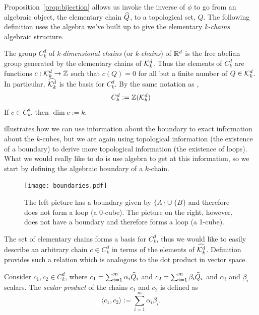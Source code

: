 Proposition~\ref{prop:bijection} allows us invoke the inverse of $\phi$ to go from an algebraic object, the elementary chain $\widehat{Q}$, to a topological set, $Q$. The following definition uses the algebra we've built up to give the elementary \textit{k-chains} algebraic structure.
%
\begin{defn}
	The group $C_k^d$ of \textit{k-dimensional chains} (or \textit{k-chains}) of $\mathbb{R}^d$ is the free abelian group generated by the elementary chains of $\mathcal{K}^{d}_k$. Thus the elements of $C_k^d$ are functions $c : \mathcal{K}^{d}_k \rightarrow \mathbb{Z}$ such that $c(Q) = 0$ for all but a finite number of $Q \in \mathcal{K}^{d}_k$. In particular, $\widehat{\mathcal{K}^{d}_k}$ is the basis for $C_k^d$. By the same notation as ,
	$$ C_k^d := \mathbb{Z}(\mathcal{K}^{d}_k) $$
	If $ c \in C_k^d$, then $\dim c := k$.
\end{defn}

 illustrates how we can use information about the boundary to exact information about the $k$-cubes, but we are again using topological information (the existence of a boundary) to derive more topological information (the existence of loops). What we would really like to do is use algebra to get at this information, so we start by defining the algebraic boundary of a $k$-chain.
%
\begin{figure}[h]
	\begin{center}
	\texttt{[image: boundaries.pdf]}
	\caption{\label{fig:boundaries} The left picture has a boundary given by $\{ A \} \cup \{ B \}$ and therefore does not form a loop (a 0-cube). The picture on the right, however, does not have a boundary and therefore forms a loop (a 1-cube).}
	\end{center}
\end{figure}

The set of elementary chains forms a basis for $C_k^d$, thus we would like to easily describe an arbitrary chain $c \in C_k^d$ in terms of the elements of $\widehat{\mathcal{K}^{d}_k}$. Definition  provides such a relation which is analogous to the dot product in vector space.

\begin{defn} \label{defn:chainprod}
	Consider $c_1, c_2 \in C_k^d$, where $c_1 = \sum_{i=1}^m \alpha_i \widehat{Q}_i $ and $ c_2 = \sum_{i=1}^m \beta_i \widehat{Q}_i $ and $\alpha_i$ and $\beta_i$ scalars. The \textit{scalar product} of the chains $c_1$ and $c_2$ is defined as
	$$ \langle c_1, c_2 \rangle := \sum_{i=1}^m \alpha_i \beta_i . $$
\end{defn}

